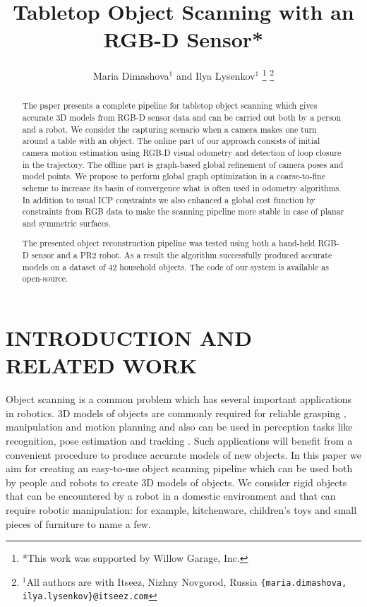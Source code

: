 \documentclass[letterpaper, 10 pt, conference]{ieeeconf}  %
\title{\LARGE \bf
Tabletop Object Scanning with an RGB-D Sensor*
}
\author{Maria Dimashova$^{1}$ and Ilya Lysenkov$^{1}$
\thanks{*This work was supported by Willow Garage, Inc.}%
\thanks{$^{1}$All authors are with Itseez, Nizhny Novgorod, Russia
        {\tt\small \{maria.dimashova, ilya.lysenkov\}@itseez.com}}%
}
\begin{document}
\maketitle
\thispagestyle{empty}
\pagestyle{empty}


\begin{abstract}
The paper presents a complete pipeline for tabletop object scanning
which gives accurate 3D models from RGB-D sensor data and can be carried out both by a person
and a robot. We consider the capturing scenario when a camera makes
one turn around a table with an object. The online part of our approach consists 
of initial camera motion estimation using RGB-D visual
odometry and detection of loop closure in the trajectory. The offline part
is graph-based global refinement of camera poses and model points.
We propose to perform global graph optimization in a coarse-to-fine scheme to 
increase its basin of convergence what is often used in odometry algorithms. 
In addition to usual ICP constraints we also enhanced a global cost function 
by constraints from RGB data to make the scanning pipeline more stable in case 
of planar and symmetric surfaces. 

The presented object reconstruction pipeline was tested using both a hand-held RGB-D sensor and a PR2 robot.
As a result the algorithm successfully produced accurate models on a dataset of 42 household objects.
The code of our system is available as open-source.

\end{abstract}


\section{INTRODUCTION AND RELATED WORK}

Object scanning is a common problem which has several important applications in robotics.
3D models of objects are commonly required for reliable grasping \cite{miller2004graspit, sahbani2012overview},
manipulation and motion planning and also can be used in perception tasks like recognition, pose estimation and tracking \cite{klank2009real, hinterstoisser2012accv}.
Such applications will benefit from a convenient procedure
to produce accurate models of new objects.
In this paper we aim for creating an easy-to-use object scanning pipeline
which can be used both by people and robots to create 3D models of objects.
We consider rigid objects that can be encountered
by a robot in a domestic environment and that can require robotic manipulation:
for example, kitchenware, children's toys and small pieces of furniture to name a few.
\end{document}
